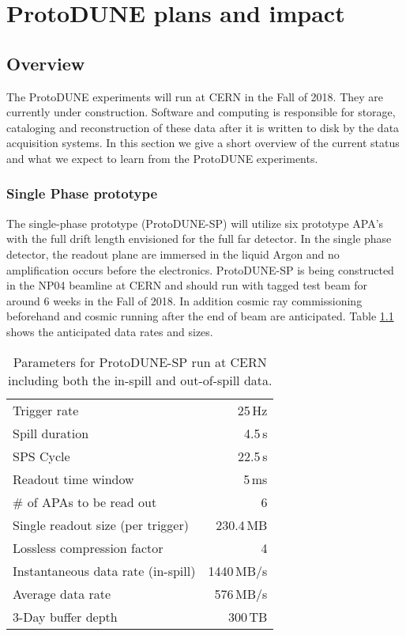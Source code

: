 \chapter{ProtoDUNE plans and impact }

\section{Overview}
The ProtoDUNE experiments will run at CERN in the Fall of 2018.  They are currently under construction.  Software and computing is responsible for storage, cataloging and reconstruction of these data after it is written to disk by the data acquisition systems.  In this section we give a short overview of the current status and what we expect to learn from the ProtoDUNE experiments.


\subsection{Single Phase prototype}

The single-phase prototype (ProtoDUNE-SP) will utilize six prototype APA's with the full drift length envisioned for the full far detector. In the single phase detector, the readout plane are immersed in the liquid Argon and no amplification occurs before the electronics.    ProtoDUNE-SP is being constructed in the NP04 beamline at CERN and should run with tagged test beam for around 6 weeks in the Fall of 2018.  In addition cosmic ray commissioning beforehand and cosmic running after the end of beam are anticipated.  Table \ref{tab:np04_data_rate}
shows the anticipated data rates and sizes. 



\begin{table}[htbp]
  \centering
  \begin{tabular}[h]{l|r}
\hline
    Trigger rate & 25\,Hz \\
    Spill duration & 4.5\,s\\
    SPS Cycle & 22.5\,s \\
    Readout time window & 5\,ms \\
    \# of APAs to be read out & 6 \\
    \hline
    Single readout size (per trigger) & 230.4\,MB \\
    Lossless compression factor & 4 \\
    Instantaneous data rate (in-spill) & 1440\,MB/s \\
    Average data rate & 576\,MB/s \\
    \hline
    3-Day buffer depth & 300\,TB \\
    \hline
  \end{tabular}
  \caption{Parameters for ProtoDUNE-SP run at CERN including both
  the in-spill and out-of-spill data.}
  \label{tab:np04_data_rate}
\end{table}
